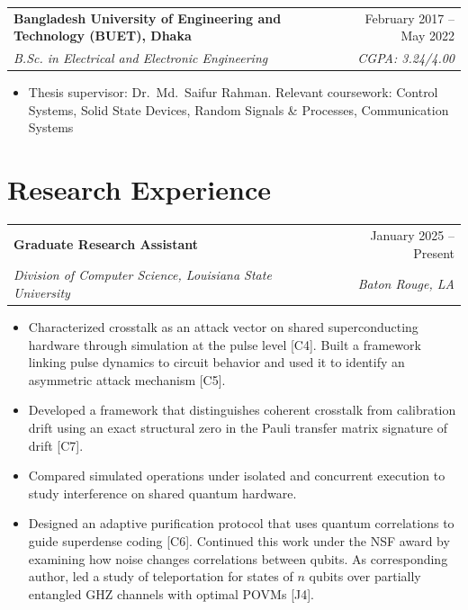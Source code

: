 \documentclass[letterpaper,11pt]{article}
\makeatletter
\newcommand{\cventry}[4]{%
  \begin{tabularx}{\textwidth}{@{}X r@{}}
    \textbf{#1} & #2 \\
    \textit{#3} & \textit{#4}
  \end{tabularx}\par\vspace{1pt}}
\newenvironment{cvblock}
  {\par\noindent\begin{minipage}[t]{\textwidth}\raggedright}
  {\end{minipage}\par\vspace{5pt}}
\makeatother
\begin{document}
\begin{cvblock}
\cventry{Bangladesh University of Engineering and Technology (BUET), Dhaka}{February 2017 -- May 2022}
        {B.Sc. in Electrical and Electronic Engineering}{CGPA: 3.24/4.00}
\begin{itemize}
  \item Thesis supervisor: Dr.~Md.~Saifur Rahman. Relevant coursework: Control Systems, Solid State Devices, Random Signals \& Processes, Communication Systems
\end{itemize}
\end{cvblock}

\section{Research Experience}

\begin{cvblock}
\cventry{Graduate Research Assistant}{January 2025 -- Present}
        {Division of Computer Science, Louisiana State University}{Baton Rouge, LA}
\begin{itemize}
  \item Characterized crosstalk as an attack vector on shared superconducting hardware through simulation at the pulse level [C4]. Built a framework linking pulse dynamics to circuit behavior and used it to identify an asymmetric attack mechanism [C5].
  \item Developed a framework that distinguishes coherent crosstalk from calibration drift using an exact structural zero in the Pauli transfer matrix signature of drift [C7].
  \item Compared simulated operations under isolated and concurrent execution to study interference on shared quantum hardware.
  \item Designed an adaptive purification protocol that uses quantum correlations to guide superdense coding [C6]. Continued this work under the NSF award by examining how noise changes correlations between qubits. As corresponding author, led a study of teleportation for states of $n$ qubits over partially entangled GHZ channels with optimal POVMs [J4].
\end{itemize}
\end{cvblock}
\end{document}
